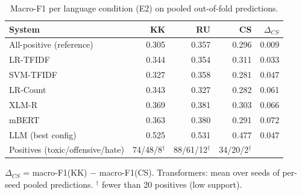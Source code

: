 \begin{table}[htbp]
\centering
\caption{Macro-F1 per language condition (E2) on pooled out-of-fold predictions.}
\label{tab:language}
\begin{tabular}{lrrrr}
\toprule
System & KK & RU & CS & $\Delta_{CS}$ \\
\midrule
All-positive (reference) & 0.305 & 0.357 & 0.296 & 0.009 \\
LR-TFIDF & 0.344 & 0.354 & 0.311 & 0.033 \\
SVM-TFIDF & 0.327 & 0.358 & 0.281 & 0.047 \\
LR-Count & 0.343 & 0.327 & 0.282 & 0.061 \\
\midrule
XLM-R & 0.369 & 0.381 & 0.303 & 0.066 \\
mBERT & 0.363 & 0.380 & 0.291 & 0.072 \\
\midrule
LLM (best config) & 0.525 & 0.531 & 0.477 & 0.047 \\
\midrule
Positives (toxic/offensive/hate) & 74/48/8$^\dagger$ & 88/61/12$^\dagger$ & 34/20/2$^\dagger$ &  \\
\bottomrule
\end{tabular}
\par\smallskip\footnotesize $\Delta_{CS}$ = macro-F1(KK) $-$ macro-F1(CS). Transformers: mean over seeds of per-seed pooled predictions. $^\dagger$ fewer than 20 positives (low support).
\end{table}
